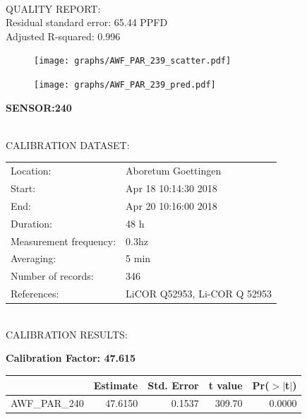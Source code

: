 \documentclass[oneside]{report}
\begin{document}
\hrulefill\\
QUALITY REPORT:\\
Residual standard error: 65.44 PPFD\\
Adjusted R-squared: 0.996



\begin{figure}[H]
  \centering
  \texttt{[image: graphs/AWF\_PAR\_239\_scatter.pdf]}
\end{figure}




\begin{figure}[H]
  \centering
  \texttt{[image: graphs/AWF\_PAR\_239\_pred.pdf]}
\end{figure}

\pagebreak


\begin{center}
\large{\textbf{SENSOR:240}}\\
\end{center}

\hrulefill\\
CALIBRATION DATASET:\\
\begin{table}[h!]
  \centering
  \label{tab:table1}
  \begin{tabular}{ll}
    Location: & Aboretum Goettingen\\ 
    
    
    Start:  & Apr 18 10:14:30 2018 \\
    End:   & Apr 20 10:16:00 2018\\ 
    Duration: & 48 h\\
    Measurement frequency: & 0.3hz\\
    Averaging:  &5 min\\
    Number of records: & 346 \\
    References: & LiCOR Q52953, Li-COR Q 52953 \\
  \end{tabular}
\end{table}

\hrulefill\\
CALIBRATION RESULTS:\\


\begin{center}
\textbf{\large{Calibration Factor: 47.615}}\\
\end{center}
\begin{table}[ht]
\centering
\begin{tabular}{rrrrr}
  \hline
 & Estimate & Std. Error & t value & Pr($>$$|$t$|$) \\ 
  \hline
AWF\_PAR\_240 & 47.6150 & 0.1537 & 309.70 & 0.0000 \\ 
   \hline
\end{tabular}
\end{table}
\end{document}
